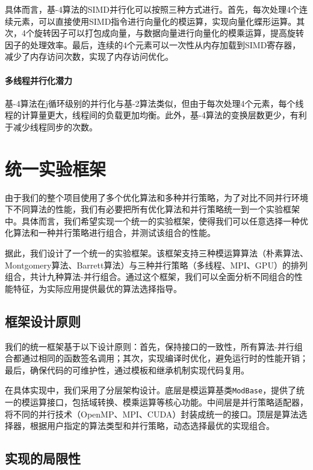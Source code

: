 \documentclass[a4paper]{article}
\begin{document}
具体而言，基-4算法的SIMD并行化可以按照三种方式进行。首先，每次处理4个连续元素，可以直接使用SIMD指令进行向量化的模运算，实现向量化蝶形运算。其次，4个旋转因子可以打包成向量，与数据向量进行向量化的模乘运算，提高旋转因子的处理效率。最后，连续的4个元素可以一次性从内存加载到SIMD寄存器，减少了内存访问次数，实现了内存访问优化。

\paragraph{多线程并行化潜力} 基-4算法在j循环级别的并行化与基-2算法类似，但由于每次处理4个元素，每个线程的计算量更大，线程间的负载更加均衡。此外，基-4算法的变换层数更少，有利于减少线程同步的次数。

\section{统一实验框架}

由于我们的整个项目使用了多个优化算法和多种并行策略，为了对比不同并行环境下不同算法的性能，我们有必要把所有优化算法和并行策略统一到一个实验框架中。具体而言，我们希望实现一个统一的实验框架，使得我们可以任意选择一种优化算法和一种并行策略进行组合，并测试该组合的性能。

据此，我们设计了一个统一的实验框架。该框架支持三种模运算算法（朴素算法、Montgomery算法、Barrett算法）与三种并行策略（多线程、MPI、GPU）的排列组合，共计九种算法-并行组合。通过这个框架，我们可以全面分析不同组合的性能特征，为实际应用提供最优的算法选择指导。

\subsection{框架设计原则}

我们的统一框架基于以下设计原则：首先，保持接口的一致性，所有算法-并行组合都通过相同的函数签名调用；其次，实现编译时优化，避免运行时的性能开销；最后，确保代码的可维护性，通过模板和继承机制实现代码复用。

在具体实现中，我们采用了分层架构设计。底层是模运算基类\texttt{ModBase}，提供了统一的模运算接口，包括域转换、模乘运算等核心功能。中间层是并行策略适配器，将不同的并行技术（OpenMP、MPI、CUDA）封装成统一的接口。顶层是算法选择器，根据用户指定的算法类型和并行策略，动态选择最优的实现组合。

\subsection{实现的局限性}
\end{document}

